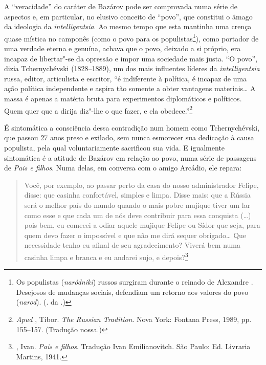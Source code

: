 A ``veracidade'' do caráter de Bazárov pode ser comprovada numa série de
aspectos e, em particular, no elusivo conceito de ``povo'', que constitui
o âmago da ideologia da \emph{intelligentsia}. Ao mesmo tempo que esta
mantinha uma crença quase mística no camponês (como o povo para os
populistas\footnote{Os populistas (\emph{naródniki}) russos surgiram durante o reinado de Alexandre . Desejosos de mudanças sociais, defendiam um retorno aos valores do povo (\emph{narod}). (. da .)}), como portador de uma verdade eterna e genuína, achava que
o povo, deixado a si próprio, era incapaz de libertar"-se da opressão e
impor uma sociedade mais justa. ``O povo'', dizia Tchernychévski (1828--1889), um dos
mais influentes líderes da \emph{intelligentsia} russa, editor,
articulista e escritor, ``é indiferente à política, é incapaz de uma
ação política independente e aspira tão somente a obter vantagens
materiais\ldots{} A massa é apenas a matéria bruta para experimentos diplomáticos e
políticos. Quem quer que a dirija diz"-lhe o que fazer, e ela obedece.''\footnote{\emph{Apud} , Tibor. \emph{The Russian Tradition}. Nova York: Fontana Press, 1989, pp. 155--157. (Tradução nossa.)}

É sintomática a consciência dessa contradição num homem como
Tchernychévski, que passou 27 anos preso e exilado, sem nunca esmorecer
sua dedicação à causa populista, pela qual voluntariamente sacrificou sua
vida. E igualmente sintomática é a atitude de Bazárov em relação ao povo, numa
série de passagens de \emph{Pais e filhos}. Numa delas, em conversa com o amigo Arcádio, ele
repara:

\begin{quotation}
Você, por exemplo, ao passar perto da casa do nosso administrador
Felipe, disse: que casinha confortável, simples e limpa. Disse mais: que
a Rússia será o melhor país do mundo quando o mais pobre mujique tiver
um lar como esse e que cada um de nós deve contribuir para essa
conquista (\ldots{}) pois bem, eu comecei a odiar aquele mujique Felipe ou
Sídor que seja, para quem devo fazer o impossível e que não me dirá
sequer obrigado\ldots{} Que necessidade tenho eu afinal de seu
agradecimento? Viverá bem numa casinha limpa e branca e eu andarei sujo,
e depois?\footnote{, Ivan. \emph{Pais e filhos}. Tradução Ivan Emilianovitch. São Paulo: Ed. Livraria Martins, 1941.} 
\end{quotation}

